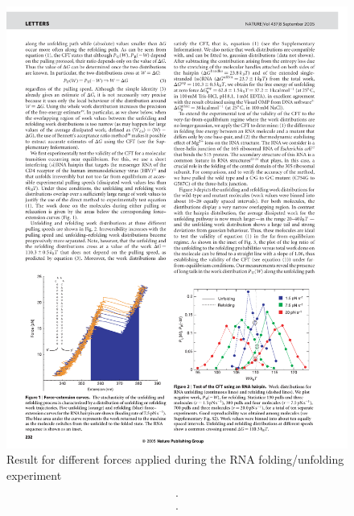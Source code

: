 \documentclass[a0]{sciposter}
\begin{document}
\begin{multicols}{3}
\begin{flushleft}
\end{flushleft}

\begin{minipage}[b]{22.0cm}
\centering
\begin{figure}[ht!]
 \includegraphics[clip, trim=10.0cm 4.1cm 2.0cm 17.7cm, width=20cm]{verification2.pdf}
 \caption{Result for different forces applied during the RNA folding/unfolding experiment \cite{Collin:2005fxa}}
\end{figure}
\end{minipage}
%
\begin{small}
\vspace{-3.0cm}


\begin{displaymath}
.
\end{displaymath}
\end{small}
\begin{displaymath}
.
\end{displaymath}
\end{multicols}
\end{document}
